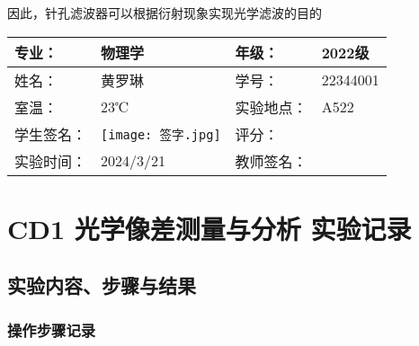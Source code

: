 \documentclass[dvipsnames, svgnames,a4paper,11pt]{article}
\begin{document}
因此，针孔滤波器可以根据衍射现象实现光学滤波的目的
	
	
	
	\clearpage
	
	\begin{table}
		\renewcommand\arraystretch{1.7}
		\centering
		\begin{tabularx}{\textwidth}{|X|X|X|X|}
			\hline
			专业： & 物理学 & 年级： & 2022级 \\
			\hline
			姓名： & 黄罗琳 & 学号： &22344001 \\
			\hline
			室温： & 23℃ & 实验地点： & A522 \\
			\hline
			学生签名：& \texttt{[image: 签字.jpg]} & 评分： &\\
			\hline
			实验时间：& 2024/3/21 & 教师签名：&\\
			\hline
		\end{tabularx}
	\end{table}
	
	\section{CD1 光学像差测量与分析 \quad\heiti 实验记录}
	
	\subsection{实验内容、步骤与结果}
	
	\subsubsection{操作步骤记录}
	
\end{document}
